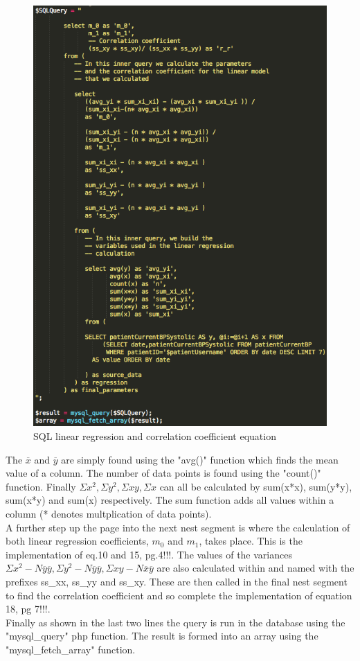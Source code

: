 \documentclass[11pt]{article}
\begin{document}
\begin{figure}
\centering
\includegraphics[scale=0.4]{mainSQL.png}
\caption{SQL linear regression and correlation coefficient equation \cite{Mike}} 
\end{figure} 
The $\overline{x}$ and $\overline{y}$ are simply found using the "avg()" function which finds the mean value of a column. The number of data points is found using the "count()" function. Finally $\Sigma x^2, \Sigma y^2, \Sigma xy, \Sigma x$ can all be calculated by sum(x*x), sum(y*y), sum(x*y) and sum(x) respectively. The sum function adds all values within a column (* denotes multplication of data points). 
\\ \indent
A further step up the page into the next nest segment is where the calculation of both linear regression coefficients, $m_0$ and $m_1$, takes place. This is the implementation of eq.10 and 15, pg.4!!!. The values of the variances$\Sigma x^2 -N\overline{y}\overline{y}, \Sigma y^2 - N\overline{y}\overline{y}, \Sigma xy - N\overline{x}\overline{y}$ are also calculated within and named with the prefixes ss\_xx, ss\_yy and ss\_xy. These are then called in the final nest segment to find the correlation coefficient and so complete the implementation of equation 18, pg 7!!!.
\\ \indent
Finally as shown in the last two lines the query is run in the database using the "mysql\_query" php function. The result is formed into an array using the "mysql\_fetch\_array" function. 
\end{document}
